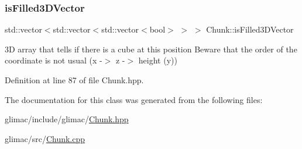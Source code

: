 \subsubsection{\texorpdfstring{is\+Filled3\+D\+Vector}{isFilled3DVector}}
{\footnotesize\ttfamily std\+::vector$<$std\+::vector$<$std\+::vector$<$bool$>$ $>$ $>$ Chunk\+::is\+Filled3\+D\+Vector}

3D array that tells if there is a cube at this position Beware that the order of the coordinate is not usual (x -\/$>$ z -\/$>$ height (y)) 

Definition at line 87 of file Chunk.\+hpp.



The documentation for this class was generated from the following files\+:\begin{DoxyCompactItemize}
\item 
glimac/include/glimac/\hyperlink{_chunk_8hpp}{Chunk.\+hpp}\item 
glimac/src/\hyperlink{_chunk_8cpp}{Chunk.\+cpp}\end{DoxyCompactItemize}
